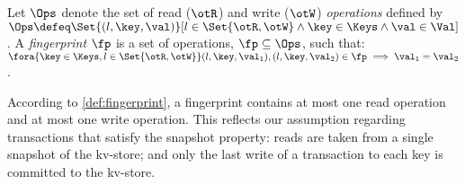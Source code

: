 \begin{definition}[Fingerprints]
\label{beebop}
\label{def:fingerprint}
Let \( \Ops\) denote the set of read (\( \otR\)) and write (\(\otW\)) \emph{operations} defined by 
$\Ops \defeq \Set{(l, \key, \val) }[ l \in \Set{\otR, \otW} \land \key \in \Keys \land \val \in \Val ]$.
A \emph{fingerprint} $\fp$ is a set of operations, $\fp \subseteq \Ops$,
such that: 
$\fora{\key \in \Keys, l  \in \Set{\otR, \otW}}
	(l, \key, \val_1), (l, \key, \val_2) \in \fp \implies \val_1 = \val_2$.
\end{definition}
\noindent 
According to \cref{def:fingerprint}, a fingerprint contains at most one read operation and at most one write operation. 
This reflects our assumption regarding transactions that satisfy the snapshot property: reads are taken from a single snapshot of the kv-store;
and 
only the last write of a transaction to each key is committed to the kv-store.
